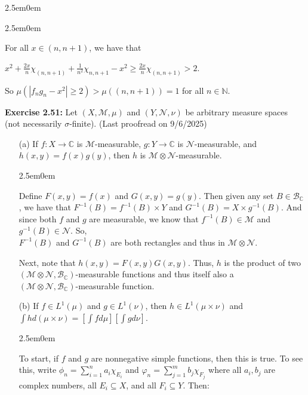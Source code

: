 \documentclass{book}
\newcommand{\myComment}{%
   \color{RawerSienna}%
   \fontsize{12}{14}\selectfont%
}
\newcommand{\exTwoP}{%
   \color{RedViolet}%
   \fontsize{13}{15}\selectfont%
}
\newenvironment{myIndent}{%
   \begin{adjustwidth}{2.5em}{0em}%
}{%
   \end{adjustwidth}%
}
\newcommand{\blab}[1]{\textbf{#1}}
\newcommand{\retTwo}{\hfill\bigbreak}
\begin{document}
\begin{enumerate}
\begin{myIndent}
\begin{myIndent}
			For all $x \in (n, n+1)$, we have that
			
			{\centering $x^2 + \frac{2x}{n}\chi_{(n, n+1)} + \frac{1}{n^2}\chi_{n, n+1} - x^2 \geq \frac{2x}{n}\chi_{(n, n+1)} > 2$.\retTwo\par}

			So $\mu(|f_ng_n - x^2| \geq 2) > \mu((n, n+1)) = 1$ for all $n \in \mathbb{N}$.\retTwo
		\end{myIndent}
	\end{myIndent}
\end{enumerate}

\blab{Exercise 2.51:} Let $(X, \mathcal{M}, \mu)$ and $(Y, \mathcal{N}, \nu)$ be arbitrary measure spaces (not necessarily $\sigma$-finite). {\myComment(Last proofread on 9/6/2025)}

\begin{enumerate}
	\item[(a)] If $f: X \rightarrow \mathbb{C}$ is $\mathcal{M}$-measurable, $g: Y \rightarrow \mathbb{C}$ is $\mathcal{N}$-measurable, and\\ $h(x, y) = f(x)g(y)$, then $h$ is $\mathcal{M} \otimes \mathcal{N}$-measurable.
	
	\begin{myIndent}\exTwoP
		Define $F(x, y) = f(x)$ and $G(x, y) = g(y)$. Then given any set $B \in \mathcal{B}_{\mathbb{C}}$, we have that $F^{-1}(B) = f^{-1}(B) \times Y$ and $G^{-1}(B) = X \times g^{-1}(B)$. And since both $f$ and $g$ are measurable, we know that $f^{-1}(B) \in \mathcal{M}$ and $g^{-1}(B) \in \mathcal{N}$. So,\\ $F^{-1}(B)$ and $G^{-1}(B)$ are both rectangles and thus in $\mathcal{M} \otimes \mathcal{N}$.\retTwo

		Next, note that $h(x, y) = F(x, y)G(x, y)$. Thus, $h$ is the product of two\\ $(\mathcal{M} \otimes \mathcal{N}, \mathcal{B}_{\mathbb{C}})$-measurable functions and thus itself also a\\ $(\mathcal{M} \otimes \mathcal{N}, \mathcal{B}_{\mathbb{C}})$-measurable function.
		\retTwo
	\end{myIndent}

	\item[(b)] If $f \in L^1(\mu)$ and $g \in L^1(\nu)$, then $h \in L^1(\mu \times \nu)$ and $\int h d(\mu \times \nu) = [\int f d\mu][\int g d\nu]$.
	
	\begin{myIndent}\exTwoP
		To start, if $f$ and $g$ are nonnegative simple functions, then this is true. To see this, write $\phi_n = \sum\limits_{i = 1}^n a_i\chi_{E_i}$ and $\varphi_n = \sum\limits_{j = 1}^m b_j \chi_{F_j}$ where all $a_i, b_j$ are complex numbers, all $E_i \subseteq X$, and all $F_i \subseteq Y$. Then:
		

\end{myIndent}
\end{enumerate}
\end{document}
